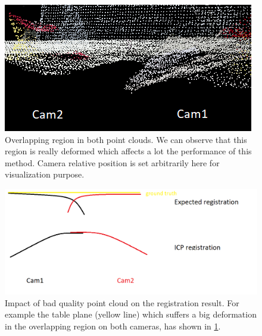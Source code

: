 \begin{figure}[h!]
    \centering
    \includegraphics[width=\textwidth]{images/bad_overlap.png}
    \caption{Overlapping region in both point clouds. We can observe that this region is really deformed which affects a lot the performance of this method. Camera relative position is set arbitrarily here for visualization purpose.}
    \label{fig:bad_overlap}
\end{figure}

\begin{figure}[h!]
    \centering
    \includegraphics[width=\textwidth]{images/bad_overlap_scheme.png}
    \caption{Impact of bad quality point cloud on the registration result. For example the table plane (yellow line) which suffers a big deformation in the overlapping region on both cameras, has shown in \ref{fig:bad_overlap}.}
    \label{fig:bad_overlap_sketch}
\end{figure}

